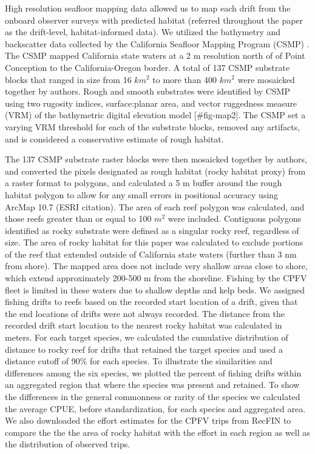 \documentclass[
  12pt,
  authoryear,
  preprint,
  3p]{elsarticle}
\begin{document}
High resolution seafloor mapping data allowed us to map each drift from
the onboard observer surveys with predicted habitat (referred throughout
the paper as the drift-level, habitat-informed data). We utilized the
bathymetry and backscatter data collected by the California Seafloor
Mapping Program (CSMP) \citep{Golden:2013:CSW}. The CSMP mapped
California state waters at a 2 m resolution north of of Point Conception
to the California-Oregon border. A total of 137 CSMP substrate blocks
that ranged in size from 16 \(km^2\) to more than 400 \(km^2\) were
mosaicked together by authors. Rough and smooth substrates were
identified by CSMP using two rugosity indices, surface:planar area, and
vector ruggedness measure (VRM) of the bathymetric digital elevation
model {[}\#fig-map2{]}. The CSMP set a varying VRM threshold for each of
the substrate blocks, removed any artifacts, and is considered a
conservative estimate of rough habitat.

The 137 CSMP substrate raster blocks were then mosaicked together by
authors, and converted the pixels designated as rough habitat (rocky
habitat proxy) from a raster format to polygons, and calculated a 5 m
buffer around the rough habitat polygon to allow for any small errors in
positional accuracy using ArcMap 10.7 (ESRI citation). The area of each
reef polygon was calculated, and those reefs greater than or equal to
100 \(m^2\) were included. Contiguous polygons identified as rocky
substrate were defined as a singular rocky reef, regardless of size. The
area of rocky habitat for this paper was calculated to exclude portions
of the reef that extended outside of California state waters (further
than 3 nm from shore). The mapped area does not include very shallow
areas close to shore, which extend approximately 200-500 m from the
shoreline. Fishing by the CPFV fleet is limited in these waters due to
shallow depths and kelp beds. We assigned fishing drifts to reefs based
on the recorded start location of a drift, given that the end locations
of drifts were not always recorded. The distance from the recorded drift
start location to the nearest rocky habitat was calculated in meters.
For each target species, we calculated the cumulative distribution of
distance to rocky reef for drifts that retained the target species and
used a distance cutoff of 90\% for each species. To illustrate the
similarities and differences among the six species, we plotted the
percent of fishing drifts within an aggregated region that where the
species was present and retained. To show the differences in the general
commonness or rarity of the species we calculated the average CPUE,
before standardization, for each species and aggregated area. We also
downloaded the effort estimates for the CPFV trips from RecFIN to
compare the the the area of rocky habitat with the effort in each region
as well as the distribution of observed trips.
\end{document}
